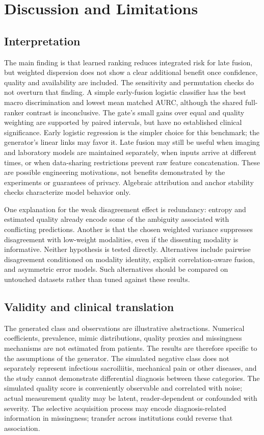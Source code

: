 \documentclass[conference]{IEEEtran}
\begin{document}
\section{Discussion and Limitations}
\subsection{Interpretation}
The main finding is that learned ranking reduces integrated risk for late fusion, but weighted dispersion does not show a clear additional benefit once confidence, quality and availability are included. The sensitivity and permutation checks do not overturn that finding. A simple early-fusion logistic classifier has the best macro discrimination and lowest mean matched AURC, although the shared full-ranker contrast is inconclusive. The gate's small gains over equal and quality weighting are supported by paired intervals, but have no established clinical significance. Early logistic regression is the simpler choice for this benchmark; the generator's linear links may favor it. Late fusion may still be useful when imaging and laboratory models are maintained separately, when inputs arrive at different times, or when data-sharing restrictions prevent raw feature concatenation. These are possible engineering motivations, not benefits demonstrated by the experiments or guarantees of privacy. Algebraic attribution and anchor stability checks characterize model behavior only.

One explanation for the weak disagreement effect is redundancy: entropy and estimated quality already encode some of the ambiguity associated with conflicting predictions. Another is that the chosen weighted variance suppresses disagreement with low-weight modalities, even if the dissenting modality is informative. Neither hypothesis is tested directly. Alternatives include pairwise disagreement conditioned on modality identity, explicit correlation-aware fusion, and asymmetric error models. Such alternatives should be compared on untouched datasets rather than tuned against these results.
\subsection{Validity and clinical translation}
The generated class and observations are illustrative abstractions. Numerical coefficients, prevalence, mimic distributions, quality proxies and missingness mechanisms are not estimated from patients. The results are therefore specific to the assumptions of the generator. The simulated negative class does not separately represent infectious sacroiliitis, mechanical pain or other diseases, and the study cannot demonstrate differential diagnosis between these categories. The simulated quality score is conveniently observable and correlated with noise; actual measurement quality may be latent, reader-dependent or confounded with severity. The selective acquisition process may encode diagnosis-related information in missingness; transfer across institutions could reverse that association.
\end{document}
